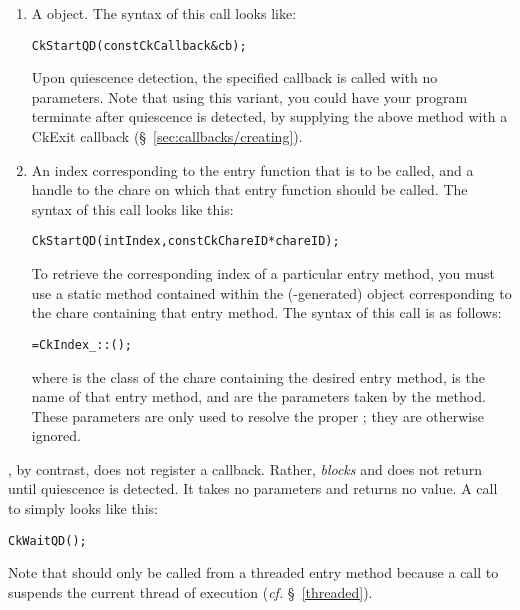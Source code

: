 \begin{enumerate}
\item 
A  object. The syntax of this call looks like:
\begin{alltt}
  CkStartQD(const CkCallback& cb);
\end{alltt}

Upon quiescence detection, the specified callback is called with no parameters. Note that
using this variant, you could have your program terminate after quiescence is detected, by
supplying the above method with a CkExit callback (\S~\ref{sec:callbacks/creating}).

\item An index corresponding to the entry function that is to be called,
and a handle to the chare on which that entry function should be called.  The
syntax of this call looks like this:

\begin{alltt}
 CkStartQD(int Index,const CkChareID* chareID);
\end{alltt}

To retrieve the corresponding index of a particular entry
method, you must use a static method contained within the
(-generated)  object corresponding to the
chare containing that entry method.  The syntax of this call is as
follows:

\begin{alltt}
=CkIndex_::();
\end{alltt}

where  is the \CC{} class of the chare containing
the desired entry method,  is the name of that entry method,
and  are the parameters taken by the method.
These parameters are only used to resolve the proper ;
they are otherwise ignored.

\end{enumerate}

, by contrast, does not register a callback.  Rather,
 {\em blocks} and does not return until quiescence is
detected.  It takes no parameters and returns no value.  A call to
 simply looks like this: 

\begin{alltt}
  CkWaitQD();
\end{alltt}

Note that  should only be called from a threaded
entry method because a call to  suspends the
current thread of execution ({\em cf.} \S~\ref{threaded}). 

